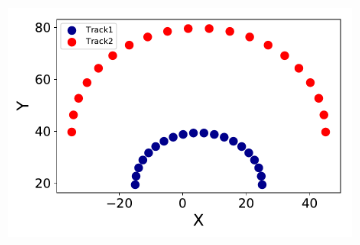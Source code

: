 \begin{figure}[ht]
	\centering
	\begin{subfigure}[b]{0.3\textwidth}
        \includegraphics[width=\textwidth]{figures/circle.pdf}
        \caption{}


\end{subfigure}
\end{figure}
